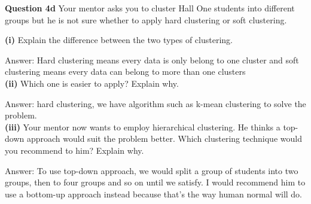\documentclass[11pt,a4paper]{report}
\begin{document}
\begin{multicols*}{2}
\noindent \textbf{Question 4d} Your mentor asks you to cluster Hall One students into different groups but he is not sure whether to apply hard clustering or soft clustering.

\noindent \textbf{(i)} Explain the difference between the two types of clustering.

\noindent Answer: Hard clustering means every data is only belong to one cluster and soft clustering means every data can belong to more than one clusters\\

\noindent \textbf{(ii)} Which one is easier to apply? Explain why.

\noindent Answer: hard clustering, we have algorithm such as k-mean clustering to solve the problem.\\

\noindent \textbf{(iii)} Your mentor now wants to employ hierarchical clustering. He thinks a top-down approach would suit the problem better. Which clustering technique would you recommend to him? Explain why. 

\noindent Answer: To use top-down approach, we would split a group of students into two groups, then to four groups and so on until we satisfy. I would recommend him to use a bottom-up approach instead because that's the way human normal will do. 

\end{multicols*}
\end{document}
